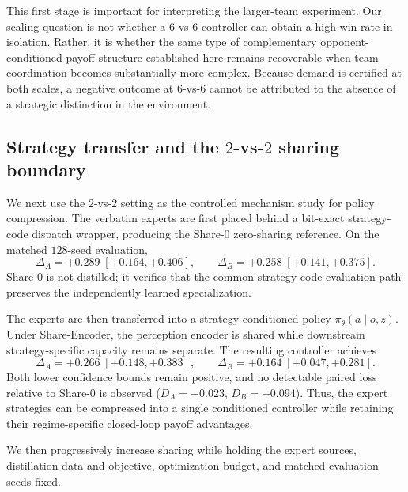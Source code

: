 This first stage is important for interpreting the larger-team experiment.
Our scaling question is not whether a $6$-vs-$6$ controller can obtain a high
win rate in isolation. Rather, it is whether the same type of complementary
opponent-conditioned payoff structure established here remains recoverable
when team coordination becomes substantially more complex. Because demand is
certified at both scales, a negative outcome at $6$-vs-$6$ cannot be
attributed to the absence of a strategic distinction in the environment.

\subsection{Strategy transfer and the $2$-vs-$2$ sharing boundary}
\label{sec:exp-sharing}

We next use the $2$-vs-$2$ setting as the controlled mechanism study for
policy compression. The verbatim experts are first placed behind a bit-exact
strategy-code dispatch wrapper, producing the Share-0 zero-sharing reference.
On the matched $128$-seed evaluation,
\[
    \Delta_A=+0.289\;[+0.164,+0.406],
    \qquad
    \Delta_B=+0.258\;[+0.141,+0.375].
\]
Share-0 is not distilled; it verifies that the common strategy-code
evaluation path preserves the independently learned specialization.

The experts are then transferred into a strategy-conditioned policy
$\pi_\theta(a\mid o,z)$. Under Share-Encoder, the perception encoder is shared
while downstream strategy-specific capacity remains separate. The resulting
controller achieves
\[
    \Delta_A=+0.266\;[+0.148,+0.383],
    \qquad
    \Delta_B=+0.164\;[+0.047,+0.281].
\]
Both lower confidence bounds remain positive, and no detectable paired loss
relative to Share-0 is observed
($D_A=-0.023$, $D_B=-0.094$). Thus, the expert strategies can be compressed
into a single conditioned controller while retaining their regime-specific
closed-loop payoff advantages.

We then progressively increase sharing while holding the expert sources,
distillation data and objective, optimization budget, and matched evaluation
seeds fixed.

